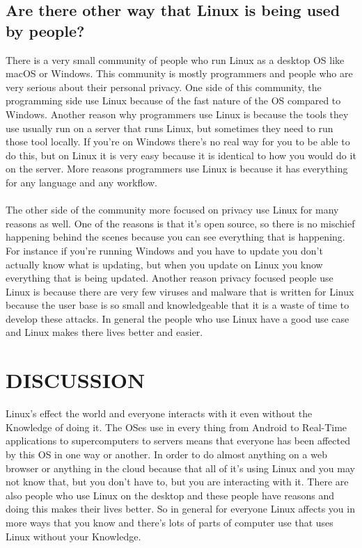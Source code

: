 \documentclass{article}
\begin{document}
\subsection{Are there other way that Linux is being used by people?}
There is a very small community of people who run Linux as a desktop OS like macOS or Windows.
This community is mostly programmers and people who are very serious about their personal privacy.
One side of this community, the programming side use Linux because of the fast nature of the OS compared to Windows.
Another reason why programmers use Linux is because the tools they use usually run on a server that runs Linux, but sometimes they need to run those tool locally.
If you're on Windows there's no real way for you to be able to do this, but on Linux it is very easy because it is identical to how you would do it on the server.
More reasons programmers use Linux is because it has everything for any language and any workflow.
\\ \\
The other side of the community more focused on privacy use Linux for many reasons as well.
One of the reasons is that it's open source, so there is no mischief happening behind the scenes because you can see everything that is happening.
For instance if you're running Windows and you have to update you don't actually know what is updating, but when you update on Linux you know everything that is being updated.
Another reason privacy focused people use Linux is because there are very few viruses and malware that is written for Linux because the user base is so small and knowledgeable that it is a waste of time to develop these attacks.
In general the people who use Linux have a good use case and Linux makes there lives better and easier.
\section{DISCUSSION}
Linux's effect the world and everyone interacts with it even without the Knowledge of doing it.
The OSes use in every thing from Android to Real-Time applications to supercomputers to servers means that everyone has been affected by this OS in one way or another.
In order to do almost anything on a web browser or anything in the cloud because that all of it's using Linux and you may not know that, but you don't have to, but you are interacting with it.
There are also people who use Linux on the desktop and these people have reasons and doing this makes their lives better.
So in general for everyone Linux affects you in more ways that you know and there's lots of parts of computer use that uses Linux without your Knowledge.
\newpage
\nocite{*}
{}

\end{document}

